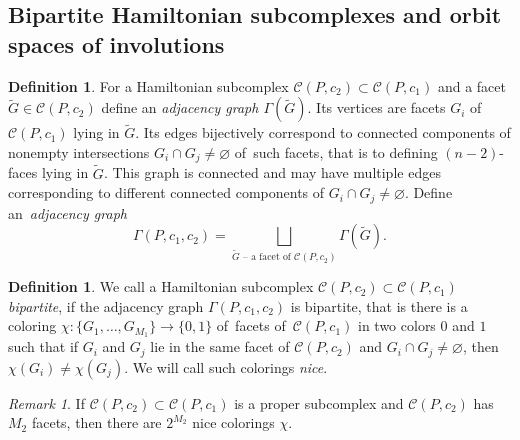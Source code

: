 \documentclass[12pt]{amsart}
\theoremstyle{definition}
\newtheorem{definition}[formula]{Definition}
\theoremstyle{remark}
\newtheorem{remark}[formula]{Remark}
\begin{document}
\subsection{Bipartite Hamiltonian subcomplexes and orbit spaces of involutions}\label{ssec:bip}
\begin{definition}\label{def:adjg}
For a Hamiltonian subcomplex $\mathcal{C}(P,c_2)\subset\mathcal{C}(P,c_1)$ 
and a facet $\widetilde{G}\in \mathcal{C}(P,c_2)$ define an {\it adjacency graph $\Gamma(\widetilde{G})$}. 
Its vertices are facets $G_i$ of $\mathcal{C}(P,c_1)$ lying in $\widetilde{G}$. Its edges bijectively correspond
to connected components of nonempty intersections $G_i\cap G_j\ne \varnothing$ of~such facets,
that is to defining $(n-2)$-faces lying in $\widetilde{G}$. This graph is connected and may have multiple edges
corresponding to different connected components of $G_i\cap G_j\ne \varnothing$.
Define an~{\it adjacency graph} 
$$
\Gamma(P,c_1,c_2)=\bigsqcup\limits_{\widetilde{G} \text{ -- a facet of }\mathcal{C}(P,c_2)} \Gamma(\widetilde{G}).
$$
\end{definition}
\begin{definition}\label{def:bip}
We call a Hamiltonian subcomplex $\mathcal{C}(P,c_2)\subset\mathcal{C}(P,c_1)$ {\it bipartite},
if the adjacency graph  $\Gamma(P,c_1,c_2)$ is bipartite, that is 
there is a coloring \linebreak $\chi\colon \{G_1,\dots, G_{M_1}\}\to\{0,1\}$ of~facets of~$\mathcal{C}(P,c_1)$ in two colors $0$ and $1$
such that if $G_i$ and $G_j$ lie in the same facet of $\mathcal{C}(P,c_2)$ and $G_i\cap G_j\ne\varnothing$,
then  $\chi(G_i)\ne \chi(G_j)$. We will call such colorings {\it nice}.
\end{definition}
\begin{remark}\label{rem:2^M}
If  $\mathcal{C}(P,c_2)\subset\mathcal{C}(P,c_1)$ is a proper subcomplex and $\mathcal{C}(P,c_2)$ has $M_2$ facets,
then there are $2^{M_2}$ nice colorings $\chi$.
\end{remark}
\end{document}
